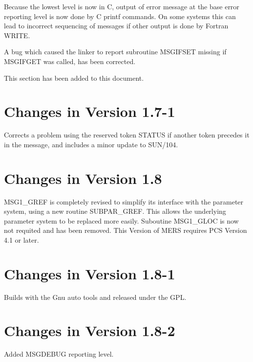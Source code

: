 \documentclass[twoside,11pt]{article}
\newcommand{\xlabel}[1]{}
\renewcommand{\_}{\texttt{\symbol{95}}}
\begin{document}
Because the lowest level is now in C, output of error message at the base
error reporting level is now done by C printf commands. On some systems this
can lead to incorrect sequencing of messages if other output is done by
Fortran WRITE.

A bug which caused the linker to report subroutine MSG\_IFSET missing if
MSG\_IFGET was called, has been corrected.

This section has been added to this document.

\section{\xlabel{changes_in_version_1_7_1}Changes in Version 1.7-1}

Corrects a problem using the reserved token STATUS if another token precedes
it in the message, and includes a minor update to SUN/104.

\section{\xlabel{changes_in_version_1_8}Changes in Version 1.8}

MSG1_GREF is completely revised to simplify its interface with the parameter
system, using a new routine SUBPAR_GREF. This allows the underlying parameter
system to be replaced more easily. Suboutine MSG1_GLOC is now not requited and
has been removed. This Version of MERS requires PCS Version 4.1 or later.

\section{\xlabel{changes_in_version_1_8_1}Changes in Version 1.8-1}

Builds with the Gnu auto tools and released under the GPL.

\section{\xlabel{changes_in_version_1_8_2}Changes in Version 1.8-2}

Added MSG\_\_DEBUG reporting level.


\end{document}

